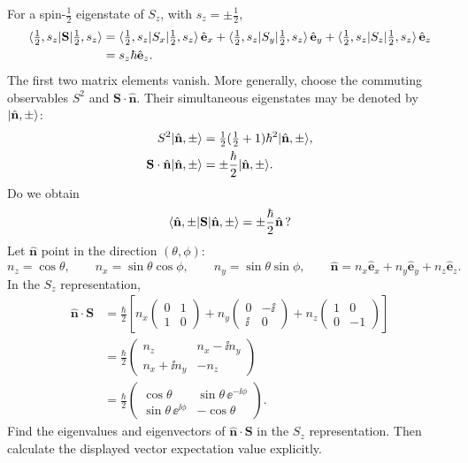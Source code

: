 For a spin-$\tfrac12$ eigenstate of $S_z$, with $s_z=\pm\tfrac12$,
\begin{align*}
 \langle \tfrac12,s_z\rvert \mathbf S\lvert \tfrac12,s_z\rangle
 &=\langle \tfrac12,s_z\rvert S_x\lvert \tfrac12,s_z\rangle\,\hat{\mathbf e}_x
   +\langle \tfrac12,s_z\rvert S_y\lvert \tfrac12,s_z\rangle\,\hat{\mathbf e}_y
   +\langle \tfrac12,s_z\rvert S_z\lvert \tfrac12,s_z\rangle\,\hat{\mathbf e}_z\\
 &=s_z\hbar\hat{\mathbf e}_z.
\end{align*}
The first two matrix elements vanish. More generally, choose the commuting
observables $S^2$ and $\mathbf S\cdot\hat{\mathbf n}$. Their simultaneous
eigenstates may be denoted by $\lvert \hat{\mathbf n},\pm\rangle$:
\begin{align*}
 S^2\lvert \hat{\mathbf n},\pm\rangle
   &=\tfrac12(\tfrac12+1)\hbar^2\lvert \hat{\mathbf n},\pm\rangle,\\
 \mathbf S\cdot\hat{\mathbf n}\lvert \hat{\mathbf n},\pm\rangle
   &=\pm\frac{\hbar}{2}\lvert \hat{\mathbf n},\pm\rangle.
\end{align*}
Do we obtain
\[
 \langle \hat{\mathbf n},\pm\rvert \mathbf S\lvert \hat{\mathbf n},\pm\rangle
   =\pm\frac{\hbar}{2}\hat{\mathbf n}\,?
\]
Let $\hat{\mathbf n}$ point in the direction $(\theta,\phi)$:
\[
 n_z=\cos\theta,\qquad n_x=\sin\theta\cos\phi,\qquad
 n_y=\sin\theta\sin\phi,\qquad
 \hat{\mathbf n}=n_x\hat{\mathbf e}_x+n_y\hat{\mathbf e}_y+n_z\hat{\mathbf e}_z.
\]
In the $S_z$ representation,
\begin{align*}
 \hat{\mathbf n}\cdot\mathbf S
 &=\frac{\hbar}{2}\left[
 n_x\begin{pmatrix}0&1\\1&0\end{pmatrix}
 +n_y\begin{pmatrix}0&-\ii\\\ii&0\end{pmatrix}
 +n_z\begin{pmatrix}1&0\\0&-1\end{pmatrix}\right]\\
 &=\frac{\hbar}{2}\begin{pmatrix}n_z&n_x-\ii n_y\\n_x+\ii n_y&-n_z\end{pmatrix}\\
 &=\frac{\hbar}{2}\begin{pmatrix}
 \cos\theta&\sin\theta\,\ee^{-\ii\phi}\\
 \sin\theta\,\ee^{\ii\phi}&-\cos\theta
 \end{pmatrix}.
\end{align*}
Find the eigenvalues and eigenvectors of $\hat{\mathbf n}\cdot\mathbf S$
in the $S_z$ representation. Then calculate the displayed vector expectation
value explicitly.
